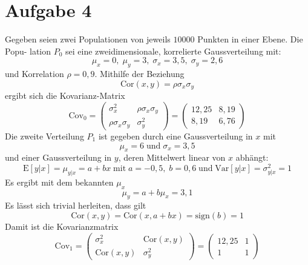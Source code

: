 \section{Aufgabe 4}
\label{sec:Aufgabe4}
Gegeben seien zwei Populationen von jeweils $10 000$ Punkten in einer Ebene. Die Popu-
lation $P_0$ sei eine zweidimensionale, korrelierte Gaussverteilung mit:
\begin{equation}
  \mu_x = 0,\; \mu_y = 3,\; \sigma_x = 3,5,\; \sigma_y = 2,6
\end{equation}
und Korrelation $\rho = 0,9$. Mithilfe der Beziehung
\begin{equation}
  \text{Cor}(x,y)=\rho \sigma_x\sigma_y
\end{equation}
ergibt sich die Kovarianz-Matrix
\begin{equation}
  \text{Cov}_0=\left(\begin{array}{rr}
    \sigma_x^2            & \rho\sigma_x\sigma_y\\
    \rho\sigma_x\sigma_y  & \sigma_y^2
  \end{array}\right)=
  \left(\begin{array}{rr}
    12,25   & 8,19\\
    8,19    & 6,76
  \end{array}\right)
\end{equation}
Die zweite Verteilung $P_1$ ist gegeben durch eine Gaussverteilung in $x$ mit
\begin{equation}
  \mu_x = 6 \; \text{und}\; \sigma_x = 3,5
\end{equation}
und einer Gaussverteilung in $y$, deren Mittelwert linear von $x$ abhängt:
\begin{equation}
  \text{E}[y|x] = \mu_{y|x} = a + bx \; \text{mit} \; a = −0,5, \; b = 0,6\; \text{und} \; \text{Var}[y|x] = \sigma_{y|x}^2 = 1
\end{equation}
Es ergibt mit dem bekannten $\mu_x$
\begin{equation}
  \mu_y=a+b\mu_x=3,1
\end{equation}
Es lässt sich trivial herleiten, dass gilt
\begin{equation}
  \text{Cor}(x,y)=\text{Cor}(x,a+bx)=\text{sign}(b)=1
\end{equation}
Damit ist die Kovarianzmatrix
\begin{equation}
  \text{Cov}_1=\left(\begin{array}{rr}
    \sigma_x^2       & \text{Cor}(x,y)\\
    \text{Cor}(x,y)  & \sigma_y^2
  \end{array}\right)=
  \left(\begin{array}{rr}
    12,25    & 1\\
    1       & 1
  \end{array}\right)
\end{equation}
